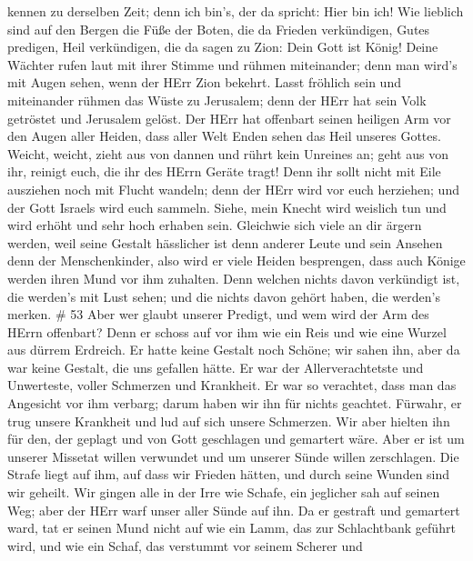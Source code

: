 kennen zu derselben Zeit; denn ich bin's, der da spricht: Hier bin ich!
 Wie lieblich sind auf den Bergen die Füße der Boten, die da
Frieden verkündigen, Gutes predigen, Heil verkündigen, die da sagen zu
Zion: Dein Gott ist König!  Deine Wächter rufen laut mit
ihrer Stimme und rühmen miteinander; denn man wird's mit Augen sehen,
wenn der HErr Zion bekehrt.  Lasst fröhlich sein und
miteinander rühmen das Wüste zu Jerusalem; denn der HErr hat sein Volk
getröstet und Jerusalem gelöst.  Der HErr hat offenbart
seinen heiligen Arm vor den Augen aller Heiden, dass aller Welt Enden
sehen das Heil unseres Gottes.  Weicht, weicht, zieht aus
von dannen und rührt kein Unreines an; geht aus von ihr, reinigt euch,
die ihr des HErrn Geräte tragt!  Denn ihr sollt nicht mit
Eile ausziehen noch mit Flucht wandeln; denn der HErr wird vor euch
herziehen; und der Gott Israels wird euch sammeln.  Siehe,
mein Knecht wird weislich tun und wird erhöht und sehr hoch erhaben
sein.  Gleichwie sich viele an dir ärgern werden, weil
seine Gestalt hässlicher ist denn anderer Leute und sein Ansehen denn
der Menschenkinder,  also wird er viele Heiden besprengen,
dass auch Könige werden ihren Mund vor ihm zuhalten. Denn welchen nichts
davon verkündigt ist, die werden's mit Lust sehen; und die nichts davon
gehört haben, die werden's merken. \# 53  Aber wer glaubt
unserer Predigt, und wem wird der Arm des HErrn offenbart? 
Denn er schoss auf vor ihm wie ein Reis und wie eine Wurzel aus dürrem
Erdreich. Er hatte keine Gestalt noch Schöne; wir sahen ihn, aber da war
keine Gestalt, die uns gefallen hätte.  Er war der
Allerverachtetste und Unwerteste, voller Schmerzen und Krankheit. Er war
so verachtet, dass man das Angesicht vor ihm verbarg; darum haben wir
ihn für nichts geachtet.  Fürwahr, er trug unsere Krankheit
und lud auf sich unsere Schmerzen. Wir aber hielten ihn für den, der
geplagt und von Gott geschlagen und gemartert wäre.  Aber er
ist um unserer Missetat willen verwundet und um unserer Sünde willen
zerschlagen. Die Strafe liegt auf ihm, auf dass wir Frieden hätten, und
durch seine Wunden sind wir geheilt.  Wir gingen alle in der
Irre wie Schafe, ein jeglicher sah auf seinen Weg; aber der HErr warf
unser aller Sünde auf ihn.  Da er gestraft und gemartert
ward, tat er seinen Mund nicht auf wie ein Lamm, das zur Schlachtbank
geführt wird, und wie ein Schaf, das verstummt vor seinem Scherer und
